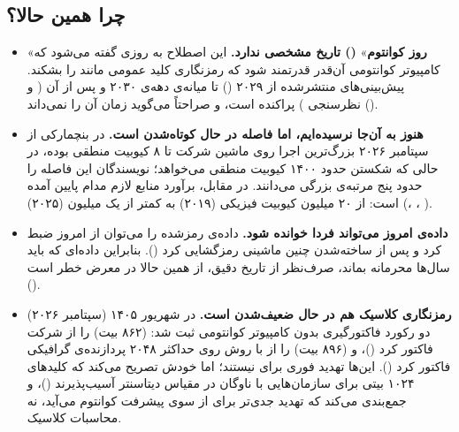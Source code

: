 \documentclass[a4paper,12pt]{article}
\begin{document}
	\subsection*{چرا همین حالا؟}
	\begin{itemize}[rightmargin=0.5cm, itemsep=5pt]
		\item «\textbf{روز کوانتوم}» \textbf{() تاریخ مشخصی ندارد.}
		این اصطلاح به روزی گفته می‌شود که کامپیوتر کوانتومی آن‌قدر قدرتمند شود که رمزنگاری کلید عمومی مانند  را بشکند.
		پیش‌بینی‌های منتشرشده از ۲۰۲۹ () تا میانه‌ی دهه‌ی ۲۰۳۰ و پس از آن ( و نظرسنجی ) پراکنده است،
		و  صراحتاً می‌گوید زمان آن را نمی‌داند
		(\href{https://qdayiscoming.com/articles/when-will-rsa-be-broken}{}).

		\item \textbf{هنوز به آن‌جا نرسیده‌ایم، اما فاصله در حال کوتاه‌شدن است.}
		در بنچمارکی از سپتامبر ۲۰۲۶ بزرگ‌ترین اجرا روی ماشین  شرکت  تا ۸ کیوبیت منطقی بوده، در حالی که شکستن  حدود ۱۴۰۰ کیوبیت منطقی می‌خواهد؛
		نویسندگان این فاصله را حدود پنج مرتبه‌ی بزرگی می‌دانند. در مقابل، برآورد منابع لازم مدام پایین آمده است:
		از ۲۰ میلیون کیوبیت فیزیکی (۲۰۱۹) به کمتر از یک میلیون (۲۰۲۵)
		(\href{https://qdayiscoming.com/articles/when-will-rsa-be-broken}{}،
		\href{https://arxiv.org/abs/2609.12146}{}،
		\href{https://arxiv.org/abs/2505.15917}{}).

		\item \textbf{داده‌ی امروز می‌تواند فردا خوانده شود.}
		داده‌ی رمزشده را می‌توان از امروز ضبط کرد و پس از ساخته‌شدن چنین ماشینی رمزگشایی کرد
		(). بنابراین داده‌ای که باید سال‌ها محرمانه بماند، صرف‌نظر از تاریخ دقیق، از همین حالا در معرض خطر است
		(\href{https://qdayiscoming.com/articles/when-will-rsa-be-broken}{}).

		\item \textbf{رمزنگاری کلاسیک هم در حال ضعیف‌شدن است.}
		در شهریور ۱۴۰۵ (سپتامبر ۲۰۲۶) دو رکورد فاکتورگیری بدون کامپیوتر کوانتومی ثبت شد:
		 (۸۶۲ بیت) را  از شرکت  فاکتور کرد
		(\href{https://www.scientificamerican.com/article/whats-the-tech-behind-the-record-breaking-rsa-260-crack/}{})،
		و  (۸۹۶ بیت) را  از  با روش  روی حداکثر ۲۰۴۸ پردازنده‌ی گرافیکی فاکتور کرد
		(\href{https://postquantum.com/security-pqc/rsa-896-factored-claude-gpus/}{}).
		این‌ها تهدید فوری برای  نیستند؛ اما  خودش تصریح می‌کند که کلیدهای ۱۰۲۴ بیتی برای سازمان‌هایی با ناوگان  در مقیاس دیتاسنتر آسیب‌پذیرند
		(\href{https://qdayiscoming.com/articles/when-will-rsa-be-broken}{})،
		و  جمع‌بندی می‌کند که تهدید جدی‌تر برای  از سوی پیشرفت کوانتوم می‌آید، نه محاسبات کلاسیک.


\end{itemize}
\end{document}
